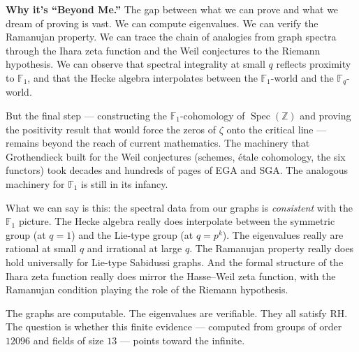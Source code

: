 \documentclass[11pt,a4paper]{article}
\theoremstyle{plain}
\theoremstyle{definition}
\newcommand{\Z}{\mathbb{Z}}
\newcommand{\F}{\mathbb{F}}
\newcommand{\Spec}{\operatorname{Spec}}
\begin{document}
\begin{tcolorbox}[breakable, colback=yellow!12, colframe=yellow!12,
  boxrule=0pt, sharp corners]
\textbf{Why it's ``Beyond Me.''}
The gap between what we can prove and what we dream of proving is
vast. We can compute eigenvalues. We can verify the Ramanujan property.
We can trace the chain of analogies from graph spectra through the
Ihara zeta function and the Weil conjectures to the Riemann
hypothesis. We can observe that spectral integrality at small $q$
reflects proximity to $\F_1$, and that the Hecke algebra
interpolates between the $\F_1$-world and the $\F_q$-world.

But the final step --- constructing the $\F_1$-cohomology of
$\Spec(\Z)$ and proving the positivity result that would force the
zeros of $\zeta$ onto the critical line --- remains beyond the reach
of current mathematics. The machinery that Grothendieck built for the
Weil conjectures (schemes, \'etale cohomology, the six functors) took
decades and hundreds of pages of EGA and SGA. The analogous machinery
for $\F_1$ is still in its infancy.

What we can say is this: the spectral data from our graphs is
\emph{consistent} with the $\F_1$ picture. The Hecke algebra really
does interpolate between the symmetric group (at $q = 1$) and the
Lie-type group (at $q = p^k$). The eigenvalues really are rational at
small $q$ and irrational at large $q$. The Ramanujan property really
does hold universally for Lie-type Sabidussi graphs. And the formal
structure of the Ihara zeta function really does mirror the Hasse--Weil
zeta function, with the Ramanujan condition playing the role of the
Riemann hypothesis.

The graphs are computable. The eigenvalues are verifiable. They all
satisfy RH. The question is whether this finite evidence --- computed
from groups of order $12096$ and fields of size $13$ --- points toward
the infinite.
\end{tcolorbox}
\end{document}
